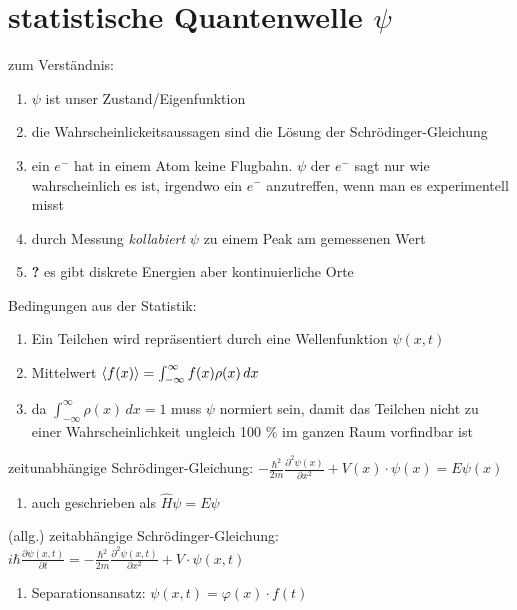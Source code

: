 \section{statistische Quantenwelle $\psi$}

zum Verständnis:
\begin{enumerate}
    \item $\psi$ ist unser Zustand/Eigenfunktion
    \item die Wahrscheinlickeitsaussagen sind die Lösung der Schrödinger-Gleichung
    \item ein $e^-$ hat in einem Atom keine Flugbahn. $\psi$ der $e^-$ sagt nur wie wahrscheinlich es ist,
    irgendwo ein $e^-$  anzutreffen, wenn man es experimentell misst
    \item durch Messung \textit{kollabiert} $\psi$ zu einem Peak am gemessenen Wert 
    \item \textbf{?} es gibt diskrete Energien aber kontinuierliche Orte 
\end{enumerate}

Bedingungen aus der Statistik:
\begin{enumerate}
    \item Ein Teilchen wird repräsentiert durch eine Wellenfunktion $\psi(x,t)$
    \item Mittelwert $\braket{f(x)}=\int_{-\infty}^{\infty} f(x)\rho(x) \,dx$
    \item da $\int_{-\infty}^{\infty} \rho(x) \,dx=1$ muss $\psi$ normiert sein, damit 
    das Teilchen nicht zu einer Wahrscheinlichkeit ungleich 100 $\%$ im ganzen Raum vorfindbar ist
\end{enumerate}

zeitunabhängige Schrödinger-Gleichung: $-\frac{\hbar^{2}}{2m}\frac{\partial^{2}\psi\left(x\right)}{\partial x^{2}}+V(x)\cdot\psi\left(x\right)=E\psi\left(x\right)$ 
\begin{enumerate}
    \item auch geschrieben als $\hat{H}\psi=E\psi$
\end{enumerate}

(allg.) zeitabhängige Schrödinger-Gleichung: $i\hbar\frac{\partial\psi\left(x,t\right)}{\partial t}=-\frac{\hbar^{2}}{2m}\frac{\partial^{2}\psi\left(x,t\right)}{\partial x^{2}}+V\cdot\psi\left(x,t\right)$
\begin{enumerate}
    \item Separationsansatz: $\psi(x,t)=\varphi(x)\cdot f(t)$

\end{enumerate}

\newpage